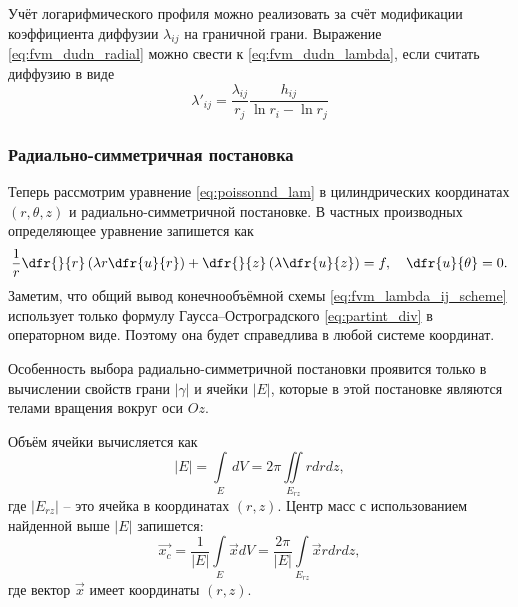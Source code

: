 Учёт логарифмического профиля можно реализовать за счёт модификации
коэффициента диффузии $\lambda_{ij}$ на граничной грани.
Выражение \cref{eq:fvm_dudn_radial}
можно свести к 
\cref{eq:fvm_dudn_lambda},
если считать диффузию в виде
\begin{equation}
\label{eq:fvm_ln_singularity_hij}
\lambda'_{ij} = \frac{\lambda_{ij}}{r_j} \frac{h_{ij}}{\ln r_i - \ln r_j}
\end{equation}

\subsubsection{Радиально-симметричная постановка}
\label{sec:fvm_radsym}
Теперь рассмотрим уравнение
\cref{eq:poissonnd_lam}
в цилиндрических координатах $(r, \theta, z)$ и радиально-симметричной постановке.
В частных производных определяющее уравнение запишется как
\begin{equation*}
\frac{1}{r}\dfr{}{r}\left( \lambda r \dfr{u}{r} \right) + \dfr{}{z}\left(\lambda \dfr{u}{z}\right) = f, \quad \dfr{u}{\theta} = 0.
\end{equation*}
Заметим, что общий вывод конечнообъёмной схемы
\cref{eq:fvm_lambda_ij_scheme}
использует только формулу Гаусса--Остроградского
\cref{eq:partint_div} в операторном виде.
Поэтому она будет справедлива в любой системе координат.

Особенность выбора радиально-симметричной постановки
проявится только в вычислении свойств грани $|\gamma|$
и ячейки $|E|$, которые в этой постановке являются телами
вращения вокруг оси $Oz$.

Объём ячейки вычисляется как
\begin{equation}
\label{eq:fvm_radsym_E}
|E| = \int\limits_E \, dV = 2 \pi \iint\limits_{E_{rz}} r dr dz,
\end{equation}
где $|E_{rz}|$ -- это ячейка в координатах $(r, z)$.
Центр масс с использованием найденной выше $|E|$ запишется:
\begin{equation}
\label{eq:fvm_radsym_Ec}
\vec{x_c} = \frac{1}{|E|} \int\limits_E \vec{x} dV = \frac{2\pi}{|E|} \int\limits_{E_{rz}} \vec{x} r dr dz,
\end{equation}
где вектор $\vec x$ имеет координаты $(r, z)$.

